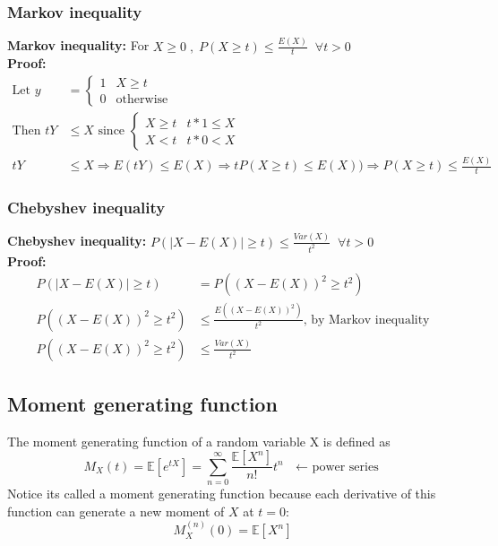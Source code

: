 \documentclass{article}
\newcommand{\abs}[1]{\lvert#1\rvert}
\begin{document}
\subsubsection{Markov inequality}
\textbf{Markov inequality: } For $X\geq 0 \;, \;P(X \geq t) \leq \frac{E(X)}{t} \; \; \forall t>0$\\
\textbf{Proof: }
\begin{align*}
    \textrm{Let } y &= \begin{cases}
        1 & X \geq t\\
        0 & \textrm{otherwise}
    \end{cases}\\
    \textrm{Then } tY &\leq X \textrm{ since } \begin{cases}
        X \geq t & t*1 \leq X \\
        X < t & t*0 < X
    \end{cases}\\
    tY &\leq X \Longrightarrow E(tY) \leq E(X) \Longrightarrow tP(X \geq t) \leq E(X)) \Longrightarrow P(X \geq t) \leq \frac{E(X)}{t}
\end{align*}

\subsubsection{Chebyshev inequality}
\textbf{Chebyshev inequality: } $P(\abs{X - E(X)} \geq t) \leq \frac{Var(X)}{t^2} \; \; \forall t > 0$\\
\textbf{Proof: }
\begin{align*}
    P(\abs{X - E(X)} \geq t) &= P((X - E(X))^2 \geq t^2)\\
    P((X - E(X))^2 \geq t^2) &\leq \frac{E((X - E(X))^2)}{t^2} \textrm{, by Markov inequality}\\
    P((X - E(X))^2 \geq t^2) &\leq \frac{Var(X)}{t^2}
\end{align*}

\subsection{Moment generating function}
The moment generating function of a random variable X is defined as 
\begin{equation*}
	M_X(t) = \mathbb{E}[e^{tX}] = \sum_{n=0}^\infty\frac{\mathbb{E}[X^n]}{n!}t^n \textrm{ $\leftarrow$ power series}
\end{equation*}
Notice its called a moment generating function because each derivative of this function can generate a new moment of $X$ at $t=0$:
\begin{equation*}
	M_X^{(n)}(0) = \mathbb{E}[X^n]
\end{equation*}
\end{document}

